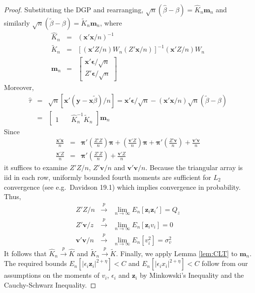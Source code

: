 \documentclass[12pt]{article}
\theoremstyle{definition}
\begin{document}
\begin{proof}
Substituting the DGP and rearranging, $\sqrt{n}\left( \widehat{\beta} - \beta\right) = \widehat{K}_n \boldsymbol{m}_n$ and similarly
$\sqrt{n} \left( \widetilde{\beta} - \beta\right) = \widetilde{K}_n \boldsymbol{m}_n$, where
  \begin{eqnarray*}
    \widehat{K}_n&=&  \left(\mathbf{x}'\mathbf{x}/n\right)^{-1}\\
    \widetilde{K}_n&=&\left[\left(\mathbf{x}'Z/n\right) W_n \left(Z'\mathbf{x}/n\right)\right]^{-1}\left(\mathbf{x}'Z/n\right) W_n \\
  \boldsymbol{m}_n &=& \left[
\begin{array}{c}
\mathbf{x}'\boldsymbol{\epsilon}/\sqrt{n}\\
Z'\boldsymbol{\epsilon}/\sqrt{n}
\end{array}
\right]
\end{eqnarray*}
Moreover,
  \begin{eqnarray*}
   \widehat{\tau} &=& \sqrt{n} \left[\mathbf{x}'(\mathbf{y} - \mathbf{x}\widetilde{\beta})/n\right] =\mathbf{x}'\boldsymbol{\epsilon}/\sqrt{n} -  (\mathbf{x}'\mathbf{x}/n)\sqrt{n}(\widetilde{\beta} - \beta) \\
        &=& \left[\begin{array}{cc} 1 \quad &\widehat{K}_n^{-1}\widetilde{K}_n\end{array}\right]\boldsymbol{m}_n
  \end{eqnarray*}
Since
  \begin{eqnarray*}
    \frac{\mathbf{x}'\mathbf{x}}{n} &=& \boldsymbol{\pi}'\left(\frac{Z'Z}{n}\right) \boldsymbol{\pi} + \left(\frac{\mathbf{v}'Z}{n}\right)\boldsymbol{\pi} +\boldsymbol{\pi}' \left(\frac{Z'\mathbf{v}}{n} \right) + \frac{\mathbf{v}'\mathbf{v}}{n}\\
      \frac{\mathbf{x}'Z}{n}&=&  \boldsymbol{\pi}' \left(\frac{Z'Z}{n}\right) + \frac{\mathbf{v}'Z}{n}
  \end{eqnarray*}
it suffices to examine $Z'Z/n$, $Z'\mathbf{v}/n$ and $\mathbf{v}'\mathbf{v}/n$. Because the triangular array is iid in each row, uniformly bounded fourth moments are sufficient for $L_2$ convergence (see e.g.\ Davidson 19.1) which implies convergence in probability. Thus,
  \begin{eqnarray*}
    Z'Z/n &\overset{p}{\rightarrow}& \lim_{n\rightarrow \infty} E_n[\mathbf{z}_i \mathbf{z}_i'] = Q_z \\
    Z' \mathbf{v}/z &\overset{p}{\rightarrow}& \lim_{n\rightarrow \infty} E_n[\mathbf{z}_i v_i] = 0\\
    \mathbf{v}'\mathbf{v}/n &\overset{p}{\rightarrow}& \lim_{n \rightarrow \infty} E_n[v_i^2] = \sigma^2_v 
  \end{eqnarray*}  
It follows that $\widehat{K}_n\overset{p}{\rightarrow} \widehat{K}$ and $\widetilde{K}_n \overset{p}{\rightarrow} \widetilde{K}$. Finally, we apply Lemma \ref{lem:CLT} to $\boldsymbol{m}_n$. The required bounds $E_n\left[\left| \epsilon_i \mathbf{z}_i \right|^{2+\eta}\right] <C$ and $E_n\left[\left| \epsilon_i x_i \right|^{2+\eta}\right] < C$ follow
from our assumptions on the moments of $v_i$, $\epsilon_i$ and $\mathbf{z}_i$ by Minkowski's Inequality and the Cauchy-Schwarz Inequality.
\end{proof}
\end{document}
